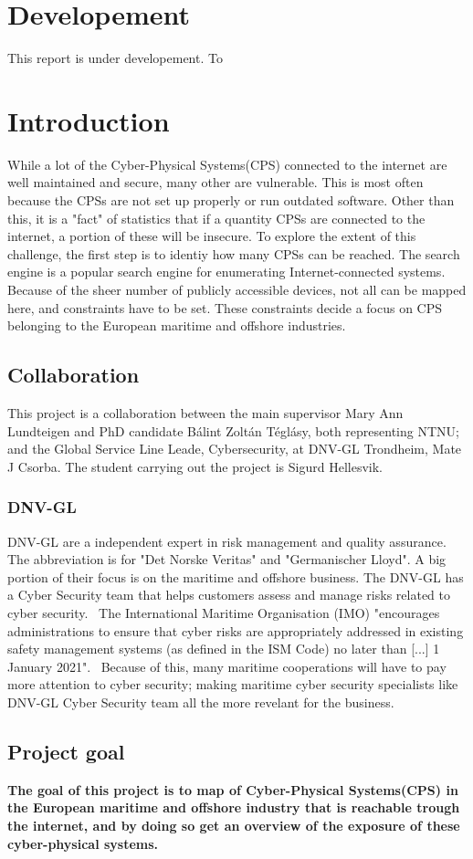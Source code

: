 \section{Developement}
This report is under developement. To 


\section{Introduction} \label{sec:intro}
While a lot of the Cyber-Physical Systems(CPS) connected to the internet are well maintained and secure, many other are vulnerable. This is most often because the CPSs are not set up properly or run outdated software. Other than this, it is a "fact" of statistics that if a quantity CPSs are connected to the internet, a portion of these will be insecure. To explore the extent of this challenge, the first step is to identiy how many CPSs can be reached. The search engine \href{https://shodan.io}{\color{blue}{Shodan}} is a popular search engine for enumerating Internet-connected systems. Because of the sheer number of  publicly accessible devices, not all can be mapped here, and constraints have to be set. These constraints decide a focus on CPS belonging to the European maritime and offshore industries.

\subsection{Collaboration}\label{sec:collaboration}
This project is a collaboration between the main supervisor Mary Ann Lundteigen and PhD candidate Bálint Zoltán Téglásy, both representing NTNU; and the Global Service Line Leade, Cybersecurity, at DNV-GL Trondheim,  Mate J Csorba. The student carrying out the project is Sigurd Hellesvik.

\subsubsection{DNV-GL}\label{sec:dnvgl}
DNV-GL are a independent expert in risk management and quality assurance. The abbreviation is for "Det Norske Veritas" and "Germanischer Lloyd". A big portion of their focus is on the maritime and offshore business. The DNV-GL has a Cyber Security team that helps customers assess and manage risks related to cyber security.~\cite{DNVGL_cybersec}  The International Maritime Organisation (IMO) "encourages administrations to ensure that cyber risks are appropriately addressed in existing safety management systems (as defined in the ISM Code) no later than [...] 1 January 2021".~\cite{IMO_2021} Because of this, many maritime cooperations will have to pay more attention to cyber security; making maritime cyber security specialists like DNV-GL Cyber Security team all the more revelant for the business. 

\subsection{Project goal}\label{sec:goal}
\textbf{The goal of this project is to map of Cyber-Physical Systems(CPS) in the European maritime and offshore industry that is reachable trough the internet, and by doing so get an overview of the exposure of these cyber-physical systems.}



